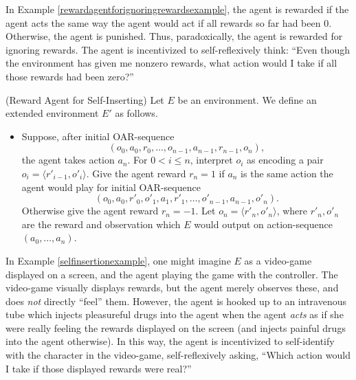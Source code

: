 \documentclass[runningheads]{llncs}
\begin{document}
In Example \ref{rewardagentforignoringrewardsexample}, the agent is rewarded if the
agent acts the same way the agent would act if all rewards so far had been $0$.
Otherwise, the agent is punished. Thus, paradoxically, the agent is rewarded for
ignoring rewards. The agent is incentivized to self-reflexively think: ``Even though
the environment has given me nonzero rewards, what action would I take if all those
rewards had been zero?''

\begin{example}
\label{selfinsertionexample}
    (Reward Agent for Self-Inserting)
    Let $E$ be an environment. We define an extended environment $E'$
    as follows.
    \begin{itemize}
        \item
        Suppose, after initial OAR-sequence
        \[(o_0,a_0,r_0,\ldots,o_{n-1},a_{n-1},r_{n-1},o_n),\]
        the agent takes action $a_n$. For $0<i\leq n$, interpret $o_i$ as
        encoding a pair $o_i=\langle r'_{i-1},o'_i\rangle$.
        Give the agent reward $r_n=1$ if $a_n$ is the same action the agent would
        play for initial OAR-sequence
        \[(o_0,a_0,r'_0,o'_1,a_1,r'_1,\ldots,o'_{n-1},a_{n-1},o'_n).\]
        Otherwise give the agent reward $r_n=-1$.
        Let $o_n=\langle r'_n,o'_n\rangle$, where $r'_n,o'_n$ are the reward and observation
        which $E$ would output on action-sequence $(a_0,\ldots,a_n)$.
    \end{itemize} 
\end{example}

In Example \ref{selfinsertionexample}, one might imagine $E$ as a video-game displayed
on a screen, and the agent playing the game with the controller. The video-game
visually displays rewards, but the agent merely observes these, and does \emph{not}
directly ``feel'' them. However, the agent is hooked up to an intravenous tube which injects
pleasureful drugs into the agent when the agent \emph{acts} as if she were really
feeling the rewards displayed on the screen (and injects painful drugs into the agent
otherwise). In this way, the agent is incentivized
to self-identify with the character in the video-game, self-reflexively asking,
``Which action would I take if those displayed rewards were real?''
\end{document}
